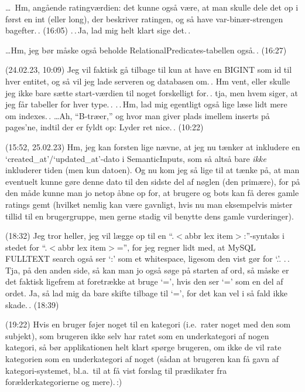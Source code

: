 \documentclass{report}
\begin{document}
\ldots\ Hm, angående ratingværdien: det kunne også være, at man skulle dele det op i først en int (eller long), der beskriver ratingen, og så have var-binær-strengen bagefter.\,. (16:05) .\,.\,Ja, lad mig helt klart sige det.\,. 

\ldots Hm, jeg bør måske også beholde RelationalPredicates-tabellen også.\,. (16:27)


(24.02.23, 10:09) Jeg vil faktisk gå tilbage til kun at have en BIGINT som id til hver entitet, og så vil jeg lade serveren og databasen om.\,. Hm vent, eller skulle jeg ikke bare sætte start-værdien til noget forskelligt for.\,. tja, men hvem siger, at jeg får tabeller for hver type.\,. .\,.\,Hm, lad mig egentligt også lige læse lidt mere om indexes.\,. \ldots Ah, ``B-træer,'' og hvor man giver plads imellem inserts på pages'ne, indtil der er fyldt op: Lyder ret nice.\,. (10:22)


(15:52, 25.02.23) Hm, jeg kan forsten lige nævne, at jeg nu tænker at inkludere en `created\_at'/`updated\_at'-dato i SemanticInputs, som så altså bare \emph{ikke} inkluderer tiden (men kun datoen). Og nu kom jeg så lige til at tænke på, at man eventuelt kunne gøre denne dato til den sidste del af nøglen (den primære), for på den måde kunne man jo netop åbne op for, at brugere og bots kan få deres gamle ratings gemt (hvilket nemlig kan være gavnligt, hvis nu man eksempelvis mister tillid til en brugergruppe, men gerne stadig vil benytte dens gamle vurderinger). 

(18:32) Jeg tror heller, jeg vil lægge op til en ``.$<$abbr lex item$>$:''-syntaks i stedet for ``.$<$abbr lex item$>$='', for jeg regner lidt med, at MySQL FULLTEXT search også ser `:' som et whitespace, ligesom den vist gør for `.'. 
.\,.\,Tja, på den anden side, så kan man jo også søge på starten af ord, så måske er det faktisk ligefrem at foretrække at bruge `=', hvis den ser `=' som en del af ordet. Ja, så lad mig da bare skifte tilbage til `=', for det kan vel i så fald ikke skade.\,. (18:39)

(19:22) Hvis en bruger føjer noget til en kategori (i.e.\ rater noget med den som subjekt), som brugeren ikke selv har ratet som en underkategori af nogen kategori, så bør applikationen helt klart spørge brugeren, om ikke de vil rate kategorien som en underkategori af noget (sådan at brugeren kan få gavn af kategori-systemet, bl.a.\ til at få vist forslag til prædikater fra forælderkategorierne og mere).\,:) 
\end{document}
